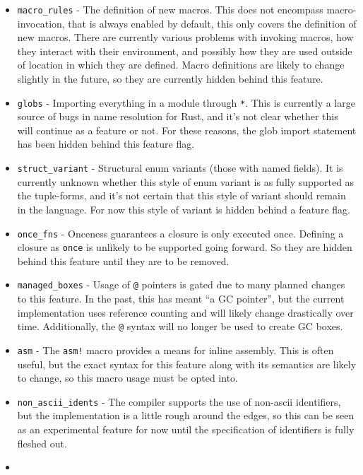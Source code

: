 \documentclass[]{article}
\begin{document}
\begin{itemize}
\item
  \texttt{macro\_rules} - The definition of new macros. This does not
  encompass macro-invocation, that is always enabled by default, this
  only covers the definition of new macros. There are currently various
  problems with invoking macros, how they interact with their
  environment, and possibly how they are used outside of location in
  which they are defined. Macro definitions are likely to change
  slightly in the future, so they are currently hidden behind this
  feature.
\item
  \texttt{globs} - Importing everything in a module through \texttt{*}.
  This is currently a large source of bugs in name resolution for Rust,
  and it's not clear whether this will continue as a feature or not. For
  these reasons, the glob import statement has been hidden behind this
  feature flag.
\item
  \texttt{struct\_variant} - Structural enum variants (those with named
  fields). It is currently unknown whether this style of enum variant is
  as fully supported as the tuple-forms, and it's not certain that this
  style of variant should remain in the language. For now this style of
  variant is hidden behind a feature flag.
\item
  \texttt{once\_fns} - Onceness guarantees a closure is only executed
  once. Defining a closure as \texttt{once} is unlikely to be supported
  going forward. So they are hidden behind this feature until they are
  to be removed.
\item
  \texttt{managed\_boxes} - Usage of \texttt{@} pointers is gated due to
  many planned changes to this feature. In the past, this has meant ``a
  GC pointer'', but the current implementation uses reference counting
  and will likely change drastically over time. Additionally, the
  \texttt{@} syntax will no longer be used to create GC boxes.
\item
  \texttt{asm} - The \texttt{asm!} macro provides a means for inline
  assembly. This is often useful, but the exact syntax for this feature
  along with its semantics are likely to change, so this macro usage
  must be opted into.
\item
  \texttt{non\_ascii\_idents} - The compiler supports the use of
  non-ascii identifiers, but the implementation is a little rough around
  the edges, so this can be seen as an experimental feature for now
  until the specification of identifiers is fully fleshed out.
\item

\end{itemize}
\end{document}

